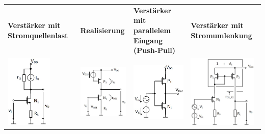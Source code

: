 \begin{tabular}{|p{}p{}|p{}|p{}|}
	\hline
	\textbf{Verstärker mit Stromquellenlast}&\textbf{Realisierung}&\textbf{Verstärker mit parallelem Eingang (Push-Pull)}&\textbf{Verstärker mit Stromumlenkung}\\
	\includegraphics[height=3.5cm]{chapters/Verstaerker/images/AmpStromquelle}&
	\includegraphics[height=3.5cm]{chapters/Verstaerker/images/AmpStromquelleReal}&
	\includegraphics[height=3.5cm]{chapters/Verstaerker/images/AmpPushPull}&
	\includegraphics[height=3.5cm]{chapters/Verstaerker/images/AmpStromumlenkungR}
\end{tabular}\\
